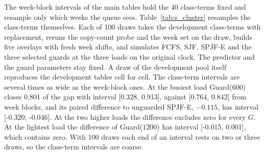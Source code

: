 \documentclass[mathematics,supfile,submit,moreauthors]{Definitions/mdpi}
\newcommand{\devnum}[1]{#1}
\begin{document}
The week-block intervals of the main tables hold the \devnum{40} class-terms fixed and
resample only which weeks the queue sees. Table~\ref{tab:s_cluster} resamples the
class-terms themselves. Each of \devnum{100} draws takes the development class-terms with
replacement, reruns the copy-count probe and the week set on the draw, builds five
overlays with fresh week shifts, and simulates FCFS, SJF, SPJF-E and the three selected
guards at the three loads on the original clock. The predictor and the guard parameters
stay fixed. A draw of the development pool itself reproduces the development tables cell
for cell. The class-term intervals are several times as wide as the week-block ones. At
the busiest load Guard($\devnum{600}$) closes \devnum{0.801} of the gap with interval
\devnum{[0.328, 0.913]}, against \devnum{[0.764, 0.842]} from week blocks, and its paired
difference to unguarded SPJF-E, \devnum{$-0.115$}, has interval \devnum{[-0.320, -0.046]}.
At the two higher loads the difference excludes zero for every $G$. At the lightest load
the difference of Guard($\devnum{1200}$) has interval \devnum{[-0.015, 0.001]}, which
contains zero. With
\devnum{100} draws each end of an interval rests on two or three draws, so the class-term
intervals are coarse.
\end{document}
